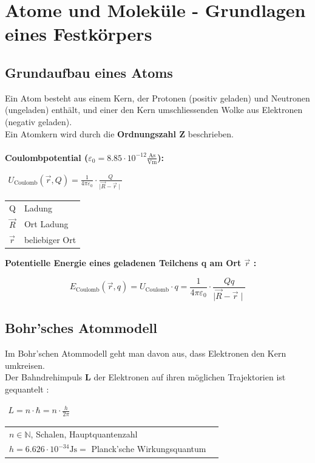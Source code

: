 \section{Atome und Moleküle - Grundlagen eines Festkörpers}

\subsection{Grundaufbau eines Atoms}
Ein Atom besteht aus einem Kern, der Protonen (positiv geladen) und Neutronen (ungeladen) enthält, und einer den Kern umschliessenden Wolke aus Elektronen (negativ geladen).\\
Ein Atomkern wird durch die \textbf{Ordnungszahl Z} beschrieben.\\
\\
\textbf{Coulombpotential ($\varepsilon_0 = 8.85\cdot 10^{-12}\frac{\mathrm{As}}{\mathrm{Vm}}$):}
\begin{center}
	$\begin{matrix}
		\displaystyle U_{\text{Coulomb}}\left(\vec{r}, Q\right) = \frac{1}{4\pi\varepsilon_0}\cdot \frac{Q}{\mid\vec{R} - \vec{r}\mid}
	\end{matrix}$\qquad\qquad
	\begin{tabular}{ll}
		Q & Ladung\\
		$\vec{R}$ & Ort Ladung\\
		$\vec{r}$ & beliebiger Ort\\
	\end{tabular}
\end{center}

\textbf{Potentielle Energie eines geladenen Teilchens q am Ort $\vec{r}$ :}

$$\displaystyle E_{\text{Coulomb}}(\vec{r}, q) = U_{\text{Coulomb}} \cdot q = \frac{1}{4\pi\varepsilon_0}\cdot \frac{Qq}{\mid\vec{R} - \vec{r}\mid}$$ %

\subsection{Bohr'sches Atommodell}
Im Bohr'schen Atommodell geht man davon aus, dass Elektronen den Kern umkreisen.\\
Der Bahndrehimpuls \textbf{L} der Elektronen auf ihren möglichen Trajektorien ist gequantelt :
\begin{center}
	$\begin{matrix}
		L = n \cdot \hbar  = n\cdot\frac{h}{2\pi}  
	\end{matrix}$
	\begin{tabular}{ll}
		$n \in \mathbb{N}$, Schalen, Hauptquantenzahl\\
		$h = 6.626\cdot10^{-34}\text{Js} =$
		Planck’sche Wirkungsquantum\\
	\end{tabular}
\end{center}

